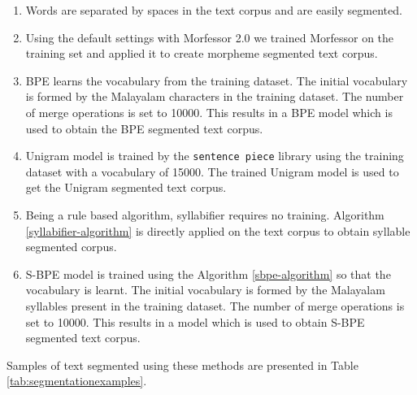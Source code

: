 \begin{enumerate}

    \item Words are separated by spaces in the text corpus and are easily segmented.

    \item

          Using the default settings with Morfessor 2.0 \cite{virpioja2013morfessor} we
          trained Morfessor on the training set and applied it to create morpheme
          segmented text corpus.

    \item
          BPE \cite{sennrich-etal-2016-neural} learns the vocabulary from the training
          dataset. The initial vocabulary is formed by the Malayalam characters in the
          training dataset. The number of merge operations is set to 10000. This results
          in a BPE model which is used to obtain the BPE segmented text corpus.
    \item Unigram \cite{kudo-2018-subword} model is trained by the \texttt{sentence
              piece} library using the training dataset with a vocabulary of 15000. The
          trained Unigram model is used to get the Unigram segmented text corpus.

    \item

          Being a rule based algorithm, syllabifier requires no training. Algorithm
          \ref{syllabifier-algorithm} is directly applied on the text corpus to obtain
          syllable segmented corpus.

    \item

          S-BPE model is trained using the Algorithm \ref{sbpe-algorithm} so that the
          vocabulary is learnt. The initial vocabulary is formed by the Malayalam
          syllables present in the training dataset. The number of merge operations is
          set to 10000. This results in a model which is used to obtain S-BPE segmented
          text corpus.

\end{enumerate}

Samples of text segmented using these methods are presented in Table
\ref{tab:segmentationexamples}.


